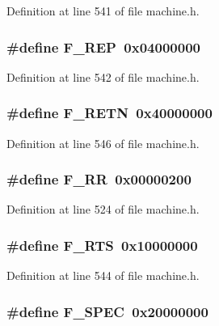 Definition at line 541 of file machine.h.
\subsubsection[{F\_\-REP}]{\setlength{\rightskip}{0pt plus 5cm}\#define F\_\-REP~0x04000000}\label{machine_8h_392ecf73feab82095d72d5a7a9a66f14}




Definition at line 542 of file machine.h.
\subsubsection[{F\_\-RETN}]{\setlength{\rightskip}{0pt plus 5cm}\#define F\_\-RETN~0x40000000}\label{machine_8h_fb11b1b5ba8ae95738ddaf78d455ecc0}




Definition at line 546 of file machine.h.
\subsubsection[{F\_\-RR}]{\setlength{\rightskip}{0pt plus 5cm}\#define F\_\-RR~0x00000200}\label{machine_8h_63a36ef451597c48e85bf563ed3d6552}




Definition at line 524 of file machine.h.
\subsubsection[{F\_\-RTS}]{\setlength{\rightskip}{0pt plus 5cm}\#define F\_\-RTS~0x10000000}\label{machine_8h_e28773ab122b9a059388f6f2ccd88e6d}




Definition at line 544 of file machine.h.
\subsubsection[{F\_\-SPEC}]{\setlength{\rightskip}{0pt plus 5cm}\#define F\_\-SPEC~0x20000000}\label{machine_8h_e4ff3f221a37ca995aaae6e284000891}




